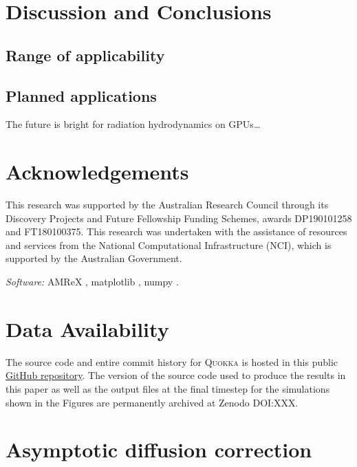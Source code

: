 \documentclass[fleqn,usenatbib]{mnras}
\begin{document}
\section{Discussion and Conclusions}
\label{section:discussion}
\subsection{Range of applicability}
\subsection{Planned applications}

The future is bright for radiation hydrodynamics on GPUs\dots

\section*{Acknowledgements}

This research was supported by the Australian Research Council through its Discovery Projects and Future Fellowship Funding Schemes, awards DP190101258 and FT180100375. This research was undertaken with the assistance of resources and services from the National Computational Infrastructure (NCI), which is supported by the Australian Government.

\emph{Software:} AMReX \citep{the_amrex_development_team_2021_5363443},
matplotlib \citep{Hunter:2007},
numpy \citep{harris2020array}.

\section*{Data Availability}
The source code and entire commit history for \textsc{Quokka} is hosted in this public \faGithub\href{https://github.com/BenWibking/quokka-code}{GitHub repository}. The version of the source code used to produce the results in this paper as well as the output files at the final timestep for the simulations shown in the Figures are permanently archived at Zenodo DOI:XXX.






\appendix
\section{Asymptotic diffusion correction}
\label{appendix:asymptotic_correction}



\bsp	%
\label{lastpage}
\end{document}
